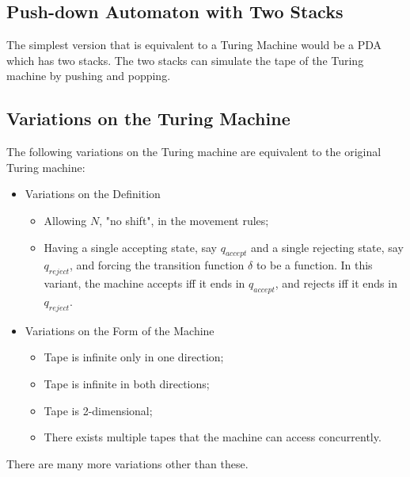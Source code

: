 \documentclass{report}
\begin{document}
			\subsection{Push-down Automaton with Two Stacks}
			The simplest version that is equivalent to a Turing Machine would be a PDA which has two stacks. The two stacks can simulate the tape of the Turing machine by pushing and popping.
			
			\subsection{Variations on the Turing Machine} \label{var_TM}
			The following variations on the Turing machine are equivalent to the original Turing machine:
			\begin{itemize}
				\item Variations on the Definition
				\begin{itemize}
					\item Allowing $N$, "no shift", in the movement rules;
					\item Having a single accepting state, say $q_{accept}$ and a single rejecting state, say $q_{reject}$, and forcing the transition function $\delta$ to be a function. In this variant, the machine accepts iff it ends in $q_{accept}$, and rejects iff it ends in $q_{reject}$.
				\end{itemize}
				\item Variations on the Form of the Machine
				\begin{itemize}
					\item Tape is infinite only in one direction;
					\item Tape is infinite in both directions;
					\item Tape is 2-dimensional;
					\item There exists multiple tapes that the machine can access concurrently.
				\end{itemize}
			\end{itemize}
			There are many more variations other than these.
\end{document}
